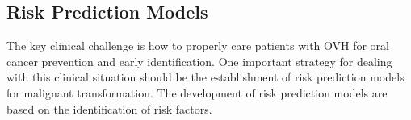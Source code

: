 \documentclass[12pt, a4paper]{article}
\begin{document}


\subsection{Risk Prediction Models}
The key clinical challenge is how to properly care patients with OVH for oral cancer prevention and early identification. 
One important strategy for dealing with this clinical situation should be the establishment of risk prediction models for malignant transformation. The development of risk prediction models are based on the identification of risk factors.
\end{document}
